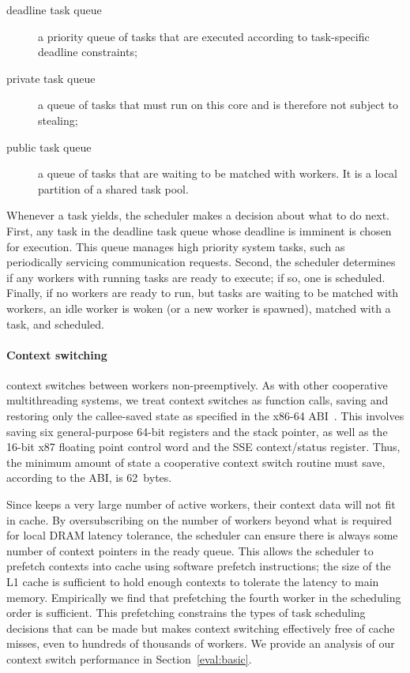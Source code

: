 \begin{description}

\item[deadline task queue] a priority queue of tasks that are executed according to task-specific deadline constraints;

\item[private task queue] a queue of tasks that must run on
this core and is therefore not subject to stealing;

\item[public task queue] a queue of tasks that are
  waiting to be matched with workers. It is a local partition of a shared
  task pool.

\end{description}
Whenever a task yields, the scheduler makes a decision about what
to do next. First, any task in the deadline task queue whose deadline
is imminent is chosen for execution. This queue manages high priority
system tasks, such as periodically servicing communication requests. Second,
the scheduler determines if any workers with running tasks are ready to
execute; if so, one is scheduled. Finally, if no workers are ready to
run, but tasks are waiting to be matched with workers, an idle worker is
woken (or a new worker is spawned), matched with a task, and scheduled.

\paragraph{Context switching} 
\Grappa context switches between workers non-preemptively. As with other
cooperative multithreading systems, we treat context switches as function
calls, saving and restoring only the callee-saved state as specified in the
x86-64 ABI~\cite{amd64:abi:2012}. This involves saving six general-purpose
64-bit registers and the stack pointer, as well as the 16-bit x87 floating
point control word and the SSE context/status register. Thus, the minimum
amount of state a cooperative context switch routine must save, according to
the ABI, is 62~bytes.

Since \Grappa keeps a very large number of active workers, their context data
will not fit in cache. By oversubscribing on the number of workers
beyond what is required for local DRAM latency tolerance, the scheduler can
ensure there is always some number of context pointers in the ready
queue. This allows the scheduler to prefetch contexts into
cache using software prefetch instructions; the size of the L1 cache is
sufficient to hold enough contexts to tolerate the latency to main
memory. Empirically we find that prefetching the fourth worker in the scheduling order is
sufficient. This prefetching constrains the types of task scheduling
decisions that can be made but makes context switching effectively
free of cache misses, even to hundreds
of thousands of workers. We provide an analysis of our context switch
performance in Section~\ref{eval:basic}.



